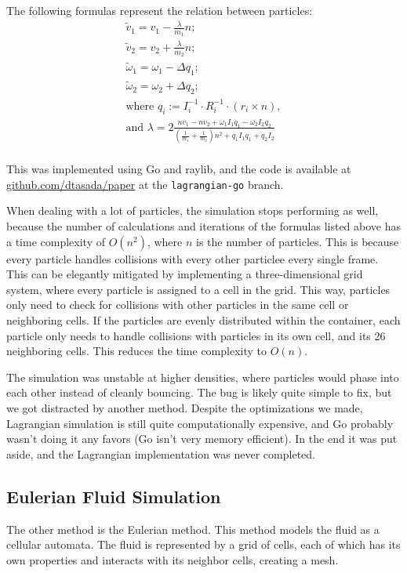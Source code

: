\documentclass[a4paper,12pt]{article}
\begin{document}
The following formulas represent the relation between particles:
\[
\begin{array}{cc}
	\tilde{v}_1 = v_1 - \frac{\lambda}{m_1} n; \\ 
	\tilde{v}_2 = v_2 + \frac{\lambda}{m_2} n; \\
	\tilde{\omega}_1 = \omega_1 - \Delta q_1; \\
	\tilde{\omega}_2 = \omega_2 + \Delta q_2; \\

	\text{where } q_i := I_i^{-1} \cdot R_i^{-1} \cdot (r_i\times n), \\
	\text{and } \lambda = 2 \frac{n v_1 - n v_2 + \omega_1 I_1 q_1 - \omega_2 I_2 q_2}
	{(\frac{1}{m_1} + \frac{1}{m_2})n^2 + q_1 I_1 q_1 + q_2 I_2} \\
\end{array}
\]

This was implemented using Go and raylib, and the code is available at
\href{www.github.com/dtasada/paper}{github.com/dtasada/paper} at the \lstinline{lagrangian-go} branch.

When dealing with a lot of particles, the simulation stops performing as well,
because the number of calculations and iterations of the formulas listed above
has a time complexity of $O(n^2)$, where $n$ is the number of particles. This is
because every particle handles collisions with every other particlee every
single frame. This can be elegantly mitigated by implementing a three-dimensional
grid system, where every particle is assigned to a cell in the grid. This way,
particles only need to check for collisions with other particles in the same cell
or neighboring cells. If the particles are evenly distributed within the container,
each particle only needs to handle collisions with particles in its own cell, and
its 26 neighboring cells. This reduces the time complexity to $O(n)$.

The simulation was unstable at higher densities, where particles would phase
into each other instead of cleanly bouncing. The bug is likely quite simple to
fix, but we got distracted by another method. Despite the optimizations we
made, Lagrangian simulation is still quite computationally expensive, and Go
probably wasn't doing it any favors (Go isn't very memory efficient). In the
end it was put aside, and the Lagrangian implementation was never completed.

\subsection{Eulerian Fluid Simulation}
The other method is the Eulerian method. This method models the fluid as a
cellular automata. The fluid is represented by a grid of cells, each of which
has its own properties and interacts with its neighbor cells, creating a mesh.
\end{document}
